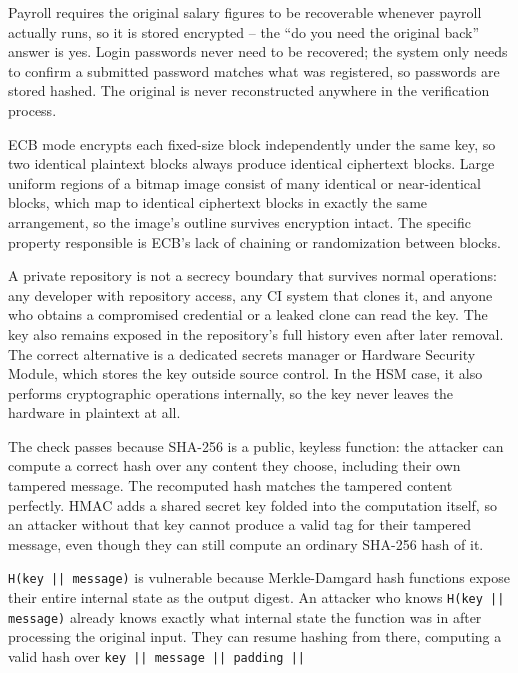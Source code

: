 \begin{answerkey}
\item Payroll requires the original salary figures to be recoverable whenever payroll actually
runs, so it is stored encrypted -- the ``do you need the original back'' answer is yes. Login
passwords never need to be recovered; the system only needs to confirm a submitted password matches
what was registered, so passwords are stored hashed. The original is never reconstructed
anywhere in the verification process.
\item ECB mode encrypts each fixed-size block independently under the same key, so two identical
plaintext blocks always produce identical ciphertext blocks. Large uniform regions of a bitmap
image consist of many identical or near-identical blocks, which map to identical ciphertext blocks
in exactly the same arrangement, so the image's outline survives encryption intact. The specific
property responsible is ECB's lack of chaining or randomization between blocks.
\item A private repository is not a secrecy boundary that survives normal operations: any developer
with repository access, any CI system that clones it, and anyone who obtains a compromised
credential or a leaked clone can read the key. The key also remains exposed in the repository's full
history even after later removal. The correct alternative is a dedicated secrets manager or
Hardware Security Module, which stores the key outside source control. In the HSM case, it also
performs cryptographic operations internally, so the key never leaves the hardware in plaintext at
all.
\item The check passes because SHA-256 is a public, keyless function: the attacker can compute a
correct hash over any content they choose, including their own tampered message. The recomputed
hash matches the tampered content perfectly. HMAC adds a shared secret key folded into the
computation itself, so an attacker without that key cannot produce a valid tag for their tampered
message, even though they can still compute an ordinary SHA-256 hash of it.
\item \texttt{H(key || message)} is vulnerable because Merkle-Damgard hash functions expose their
entire internal state as the output digest. An attacker who knows \texttt{H(key || message)}
already knows exactly what internal state the function was in after processing the original input.
They can resume hashing from there, computing a valid hash over \texttt{key || message || padding ||
}
\end{answerkey}
